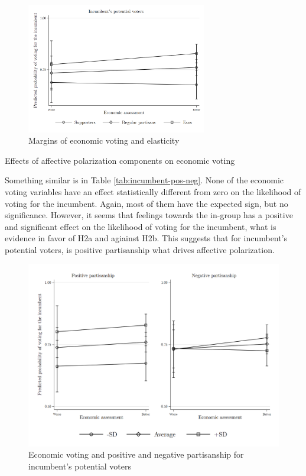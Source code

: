 \documentclass[a4paper, svgnames]{article}
\begin{document}
\begin{figure}[H]
	\centering
	\includegraphics[width=0.7\textwidth]{Figures/margins.png}
	\caption{\label{fig:margins}Margins of economic voting and elasticity }
\end{figure}


\begin{table}[H]
	\label{inc-pos-neg}
	\centering
	\caption{\label{tab:incumbent-pos-neg} Effects of affective polarization components on economic voting}
	

\end{table}

Something similar is in Table \ref{tab:incumbent-pos-neg}. None of the economic voting variables have an effect statistically different from zero on the likelihood of voting for the incumbent. Again, most of them have the expected sign, but no significance. However, it seems that feelings towards the in-group has a positive and significant effect on the likelihood of voting for the incumbent, what is evidence in favor of H2a and agiainst H2b. This suggests that for incumbent's potential voters, is positive partisanship what drives affective polarization.

\begin{figure}[H]
	\centering
	\includegraphics[width=\textwidth]{Figures/pos-neg.png}
	\caption{\label{fig:pos-neg-inc-margins} Economic voting and positive and negative partisanship for incumbent's potential voters}
\end{figure}
\end{document}
